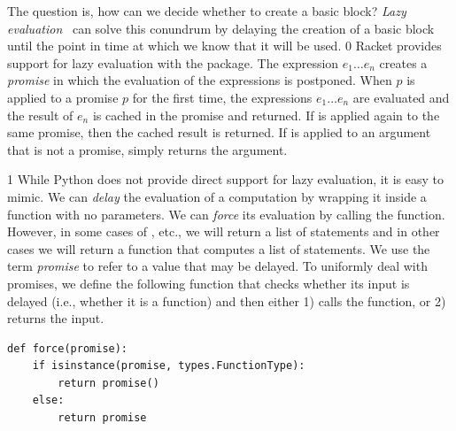 \documentclass[7x10]{TimesAPriori_MIT}%
\def\racketEd{0}
\def\pythonEd{1}
\def\edition{1}
\newcommand{\pythonColor}[0]{}
\numberwithin{theorem}{chapter}
\numberwithin{definition}{chapter}
\numberwithin{equation}{chapter}
\begin{document}
The question is, how can we decide whether to create a basic block?
\emph{Lazy evaluation}~\citep{Friedman:1976aa} can solve this conundrum by
delaying the creation of a basic block until the point in time at which
we know that it will be used.
%
{\if\edition\racketEd
%
Racket provides support for
lazy evaluation with the
\href{https://docs.racket-lang.org/reference/Delayed_Evaluation.html}{}
package. The expression  $e_1 \ldots e_n$\key{)}
 creates a
\emph{promise} in which the evaluation of the
expressions is postponed. When 
$p$\key{)} is applied to a promise $p$ for the
first time, the expressions $e_1 \ldots e_n$ are evaluated and the
result of $e_n$ is cached in the promise and returned. If 
is applied again to the same promise, then the cached result is
returned.  If  is applied to an argument that is not a
promise,  simply returns the argument.
%
\fi}
%
{\if\edition\pythonEd\pythonColor
%
While Python does not provide direct support for lazy evaluation, it
is easy to mimic. We can \emph{delay} the evaluation of a computation
by wrapping it inside a function with no parameters. We can
\emph{force} its evaluation by calling the function. However, in some
cases of , etc., we will return a list of
statements and in other cases we will return a function that computes
a list of statements. We use the term \emph{promise} to refer to a
value that may be delayed.  To uniformly deal with
promises, we define the following  function that checks
whether its input is delayed (i.e., whether it is a function) and then
either 1) calls the function, or 2) returns the input.
\begin{lstlisting}
def force(promise):
    if isinstance(promise, types.FunctionType):
        return promise()
    else:
        return promise
\end{lstlisting}
%
\fi}
\end{document}
